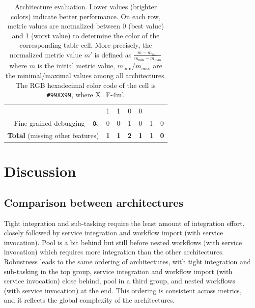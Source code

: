 \documentclass[preprint,3p,twocolumn]{elsarticle}
\begin{document}
\begin{table}
\begin{tabular}{rcccccc}
                                     & \cellcolor[HTML]{99BB99}1
                                     & \cellcolor[HTML]{99BB99}1
                                     & \cellcolor[HTML]{99FF99}0
                                     & \cellcolor[HTML]{99FF99}0\\
  Fine-grained debugging -- \texttt{O$_2$}   & \cellcolor[HTML]{99FF99}0
                                     & \cellcolor[HTML]{99FF99}0
                                     & \cellcolor[HTML]{99BB99}1
                                     & \cellcolor[HTML]{99FF99}0
                                     & \cellcolor[HTML]{99BB99}1
                                     & \cellcolor[HTML]{99FF99}0\\
  \textbf{Total} (missing other features) & \cellcolor[HTML]{99DD99}\textbf{1}
                                     & \cellcolor[HTML]{99DD99}\textbf{1}
                                     & \cellcolor[HTML]{99BB99}\textbf{2}
                                     & \cellcolor[HTML]{99DD99}\textbf{1}
                                     & \cellcolor[HTML]{99DD99}\textbf{1}
                                     & \cellcolor[HTML]{99FF99}\textbf{0}\\
\end{tabular}

\caption{Architecture evaluation. Lower values (brighter colors) indicate better performance. On each row, metric values are
  normalized between 0 (best value) and 1 (worst value) to determine the
  color of the corresponding table cell. More precisely, the normalized metric value $m'$ is
  defined as
  $\frac{m-m_{\mathrm{min}}}{m_{\mathrm{min}}-m_{\mathrm{max}}}$ where
  $m$ is the initial metric value, $m_{\mathrm{min}}$/$m_{\mathrm{max}}$
  are the minimal/maximal values among all architectures. The RGB hexadecimal color code of the cell
  is \texttt{\#99XX99}, where X=F-4m'.}
\label{table:evaluation}
\end{table}



\section{Discussion}

\subsection{Comparison between architectures}

Tight integration and sub-tasking require the least amount of
integration effort, closely followed by service integration and
workflow import (with service invocation). Pool is a bit behind but
still before nested workflows (with service invocation) which requires
more integration than the other architectures. Robustness leads to the
same ordering of architectures, with tight integration and sub-tasking
in the top group, service integration and workflow import (with
service invocation) close behind, pool in a third group, and nested
workflows (with service invocation) at the end. This ordering is
consistent across metrics, and it reflects the global complexity of
the architectures.
\end{document}
